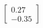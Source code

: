 \documentclass[preview]{standalone}
\begin{document}
\begin{align*}
\begin{bmatrix} 0.27 \\ -0.35 \end{bmatrix}
\end{align*}
\end{document}
